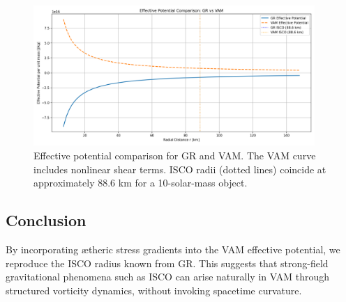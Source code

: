 \begin{figure}[H]
    \centering
    \includegraphics[width=0.95\textwidth]{images/VAM_GR_ISCO_Benchmark}
    \caption{Effective potential comparison for GR and VAM. The VAM curve includes nonlinear shear terms. ISCO radii (dotted lines) coincide at approximately 88.6 km for a 10-solar-mass object.}\label{fig:figure}
\end{figure}

\subsection{Conclusion}

By incorporating ætheric stress gradients into the VAM effective potential, we reproduce the ISCO radius known from GR. This suggests that strong-field gravitational phenomena such as ISCO can arise naturally in VAM through structured vorticity dynamics, without invoking spacetime curvature.


